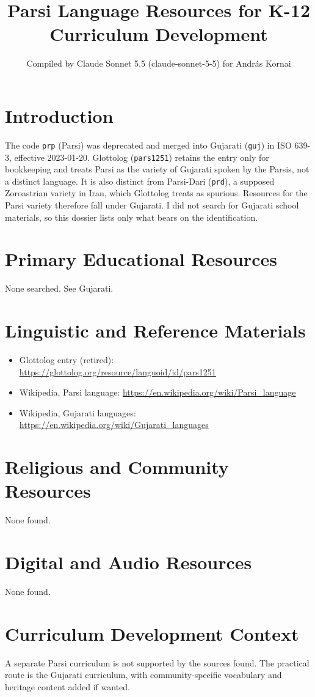 \documentclass[12pt]{article}
\title{Parsi Language Resources for K-12 Curriculum Development}
\author{Compiled by Claude Sonnet 5.5 (claude-sonnet-5-5) for Andr\'as Kornai}
\date{}
\begin{document}
\maketitle

\section{Introduction}
The code \texttt{prp} (Parsi) was deprecated and merged into Gujarati (\texttt{guj}) in ISO 639-3, effective 2023-01-20. Glottolog (\texttt{pars1251}) retains the entry only for bookkeeping and treats Parsi as the variety of Gujarati spoken by the Parsis, not a distinct language. It is also distinct from Parsi-Dari (\texttt{prd}), a supposed Zoroastrian variety in Iran, which Glottolog treats as spurious. Resources for the Parsi variety therefore fall under Gujarati. I did not search for Gujarati school materials, so this dossier lists only what bears on the identification.

\section{Primary Educational Resources}
None searched. See Gujarati.

\section{Linguistic and Reference Materials}
\begin{itemize}
\item Glottolog entry (retired): \url{https://glottolog.org/resource/languoid/id/pars1251}
\item Wikipedia, Parsi language: \url{https://en.wikipedia.org/wiki/Parsi_language}
\item Wikipedia, Gujarati languages: \url{https://en.wikipedia.org/wiki/Gujarati_languages}
\end{itemize}

\section{Religious and Community Resources}
None found.

\section{Digital and Audio Resources}
None found.

\section{Curriculum Development Context}
A separate Parsi curriculum is not supported by the sources found. The practical route is the Gujarati curriculum, with community-specific vocabulary and heritage content added if wanted.
\end{document}

